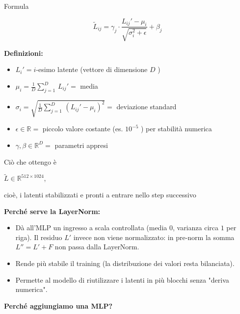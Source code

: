\documentclass[
  11pt,
]{article}
\begin{document}
Formula

\[{\widetilde{L}}_{ij} = \gamma_{j} \cdot \frac{L_{ij}' - \mu_{i}}{\sqrt{\sigma_{i}^{2} + \epsilon}} + \beta_{j}\]

\textbf{Definizioni:}

\begin{itemize}
\item
  \(L_{i}' = i\)-esimo latente (vettore di dimensione \(D\) )
\item
  \(\mu_{i} = \frac{1}{D}\sum_{j = 1}^{D}\, L_{ij}' =\) media
\item
  \(\sigma_{i} = \sqrt{\frac{1}{D}\sum_{j = 1}^{D}\,\left( L_{ij}' - \mu_{i} \right)^{2}} =\)
  deviazione standard
\item
  \(\epsilon \in \mathbb{R} =\) piccolo valore costante (es.
  \(10^{- 5}\) ) per stabilità numerica
\item
  \(\gamma,\beta \in \mathbb{R}^{D} =\) parametri appresi
\end{itemize}

Ciò che ottengo è


\(\widetilde{L} \in \mathbb{R}^{512 \times 1024}\),


cioè, i latenti stabilizzati e pronti a entrare nello step successivo

\textbf{Perché serve la LayerNorm:}

\begin{itemize}
\item
  Dà all'MLP un ingresso a scala controllata (media $0$, varianza circa $1$ per riga). Il residuo $L'$ invece non viene normalizzato: in pre-norm la somma $L'' = L' + F$ non passa dalla LayerNorm.
\item
  Rende più stabile il training (la distribuzione dei valori resta
  bilanciata).
\item
  Permette al modello di riutilizzare i latenti in più blocchi senza
  "deriva numerica".
\end{itemize}

\textbf{Perché aggiungiamo una MLP?}
\end{document}
